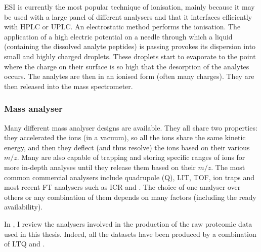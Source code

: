 \gls{ESI} is currently the most popular technique of ionisation, mainly
because it may be used with a large panel of different analysers and that it
interfaces efficiently with \gls{HPLC} or \gls{UPLC}. An electrostatic method
performs the ionisation. The application of a high electric potential on
a needle through which a liquid (containing the dissolved analyte peptides)
is passing provokes its dispersion into small and highly charged droplets.
These droplets start to evaporate to the point where the charge on their surface
is so high that the desorption of the analytes occurs.  The analytes are then
in an ionised form (often many charges). They are then released into the mass
spectrometer. 

\subsubsection{Mass analyser}

Many different mass analyser designs are available. They all share two properties:
they accelerated the ions (in a vacuum), so all the ions share the same kinetic
energy, and then they deflect (and thus resolve) the ions based on
their various $m/z$. Many are also
capable of trapping and storing specific ranges of ions for more in-depth analyses until
they release them based on their $m/z$.
The most common commercial analysers include quadrupole (Q), \acrfull{LIT},
\acrfull{TOF}, ion traps and most recent \gls{FT} analysers such as \acrfull{ICR}
and \orbi.
The choice of one analyser over others or any combination of them
depends on many factors (including the ready availability).~

In ,
I review the analysers involved in
the production of the raw proteomic data used in this thesis.
Indeed, all the datasets have been
produced by a combination of \acrfull{LTQ} and \orbi.%

